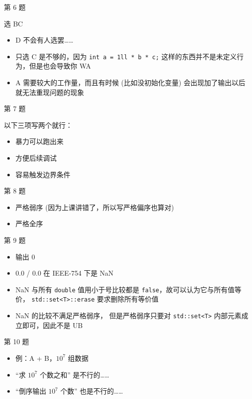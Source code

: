 \documentclass[10pt,mathserif]{beamer}
\begin{document}
\begin{frame}{第 6 题}
	
	\pause
	选 BC
	\begin{itemize}
		\item D 不会有人选罢……
		\item 只选 C 是不够的，因为 \lstinline{int a = 1ll * b * c;}
			这样的东西并不是未定义行为，但是也会导致你 WA
		\item A 需要较大的工作量，而且有时候 (比如没初始化变量)
			会出现加了输出以后就无法重现问题的现象
	\end{itemize}
\end{frame}

\begin{frame}{第 7 题}
	
	\pause
	以下三项写两个就行：
	\begin{itemize}
		\item 暴力可以跑出来
		\item 方便后续调试
		\item 容易触发边界条件
	\end{itemize}
\end{frame}

\begin{frame}{第 8 题}
	
	\pause
	\begin{itemize}
		\item 严格弱序 (因为上课讲错了，所以写严格偏序也算对)
		\item 严格全序
	\end{itemize}
\end{frame}

\begin{frame}{第 9 题}
	
	\pause
	\begin{itemize}
		\item 输出 0
		\item 0.0 / 0.0 在 IEEE-754 下是 NaN
		\item NaN 与所有 \lstinline{double} 值用小于号比较都是
			\lstinline{false}，故可以认为它与所有值等价，
			\lstinline{std::set<T>::erase} 要求删除所有等价值
		\item NaN 的比较不满足严格弱序，
			但是严格弱序只要对 \lstinline{std::set<T>}
			内部元素成立即可，因此不是 UB
	\end{itemize}
\end{frame}

\begin{frame}{第 10 题}
	
	\pause
	\begin{itemize}
		\item 例：A + B，$10^7$ 组数据
		\item “求 $10^7$ 个数之和” 是不行的……
		\item “倒序输出 $10^7$ 个数” 也是不行的……
	\end{itemize}
\end{frame}
\end{document}
